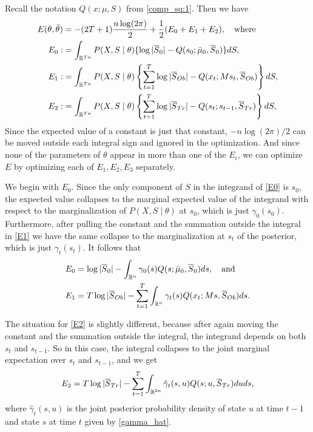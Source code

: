 \documentclass[12pt,leqno]{article}
\begin{document}
  
Recall the notation $Q(x;\mu,S)$ from \eqref{comp_sq:1}.  Then we have
\begin{align}
  E(\theta,\bar{\theta}) &= -(2T+1)\frac{n\log(2\pi)}{2} + \frac{1}{2}(E_0 + E_1 + E_2),\quad\text{where}\notag\\
  E_0 :&=\int_{{\mathbb R}^{Tn}}P(X,S\mid\theta)\{\log|\overline{S}_0| - Q(s_0;\bar{\mu}_0,\overline{S}_0)\}dS,\label{E0}\\
  E_1 :&= \int_{{\mathbb R}^{Tn}}P(X,S\mid\theta)\left\{\sum_{t=1}^T\log|\overline{S}_{Ob}| - Q(x_t;Ms_t,\overline{S}_{Ob})\right\}dS,
\label{E1}\\
  E_2 :&= \int_{{\mathbb R}^{Tn}}P(X,S\mid\theta)\left\{\sum_{t=1}^T\log|\overline{S}_{Tr}| - Q(s_t;s_{t-1},\overline{S}_{Tr})\right\}dS,
\label{E2}
\end{align}
Since the expected value of a constant is just that constant, $-n\log(2\pi)/2$ can be moved outside each
integral sign and ignored in the optimization.  And since none of the parameters of $\theta$ appear in more
than one of the $E_i$, we can optimize $E$ by optimizing each of $E_1,E_2,E_3$ separately.

We begin with $E_0$. Since the only component of $S$ in the integrand of \eqref{E0} is $s_0$, the expected value
collapses to the marginal 
expected value of the integrand with respect to the marginalization of $P(X,S\mid\theta)$ at $s_0$, which is just 
$\gamma_0(s_0)$.  Furthermore, after pulling the constant and the summation 
outside the integral in \eqref{E1} we have the same collapse to the marginalization at $s_t$ of the posterior, which
is just $\gamma_t(s_t)$.  It follows that
\begin{align*}
E_0 &= \log|\overline{S}_0| - \int_{{\mathbb R}^n}\gamma_0(s)Q(s;\bar{\mu}_0,\overline{S}_0)ds,\quad\text{and}\\
E_1 &= T\log|\overline{S}_{Ob}| - \sum_{t=1}^T\int_{{\mathbb R}^n}\gamma_t(s)Q(x_t;Ms,\overline{S}_{Ob})ds.
\end{align*}

The situation for \eqref{E2} is slightly different, because after again moving the constant and the summation outside
the integral, the integrand depends on both $s_t$ and $s_{t-1}$.  So in this case, the integral collapses to the 
joint marginal expectation over $s_t$ and $s_{t-1}$, and we get
$$
E_2 = T\log|\overline{S}_{Tr}| - \sum_{t=1}^T\int_{{\mathbb R}^{2n}}\hat{\gamma}_t(s,u)Q(s;u,\overline{S}_{Tr})duds,
$$
where $\hat{\gamma}_t(s,u)$ is the joint posterior probability density of state $u$ at time $t-1$ and state $s$ 
at time $t$ given by \eqref{gamma_hat}.
\end{document}
